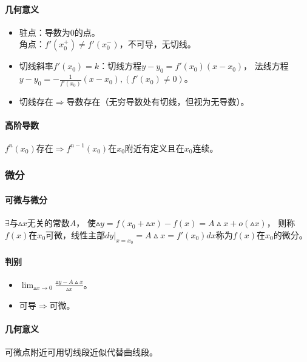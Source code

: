 \documentclass[
12pt, %
a4paper, 
oneside, %
headinclude,footinclude, %
]{scrartcl}
\begin{document}
\paragraph{几何意义}
\begin{itemize}
\item 驻点：导数为$ 0 $的点。\\
角点：$ f'(x_0^+) \neq f'(x_0^-) $，不可导，无切线。
\item 切线斜率$ f'(x_0) = k $：切线方程$ y - y_0 = f'(x_0)(x - x_0) $，
法线方程$ y - y_0 = -\frac{1}{f'(x_0)}(x - x_0),(f'(x_0) \neq 0) $。
\item 切线存在$ \Rightarrow $导数存在（无穷导数处有切线，但视为无导数）。
\end{itemize}
\paragraph{高阶导数}
$ f^{n}(x_0) $存在$ \Rightarrow $$ f^{n - 1}(x_0) $在$ x_0 $附近有定义且在$ x_0 $连续。
\subsubsection{微分}
\paragraph{可微与微分}
$ \exists$与$ \vartriangle x $无关的常数$ A $，
使$ \vartriangle y = f(x_0 + \vartriangle x) - f(x) = A \vartriangle x + o(\vartriangle x) $，
则称$ f(x) $在$ x_0 $可微，线性主部$ dy|_{x = x_0} = A \vartriangle x = f'(x_0)dx $称为$ f(x) $在$ x_0 $的微分。
\paragraph{判别}
\begin{itemize}
\item $ \lim_{\vartriangle x \to 0} \frac{\vartriangle y - A \vartriangle x}{\vartriangle x} $。
\item 可导$ \Rightarrow $可微。
\end{itemize}
\paragraph{几何意义}
可微点附近可用切线段近似代替曲线段。
\end{document}

